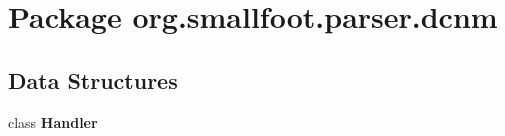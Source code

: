 \section{Package org.\+smallfoot.\+parser.\+dcnm}
\label{namespaceorg_1_1smallfoot_1_1parser_1_1dcnm}
\subsection*{Data Structures}
\begin{DoxyCompactItemize}
\item 
class {\bf Handler}
\end{DoxyCompactItemize}
